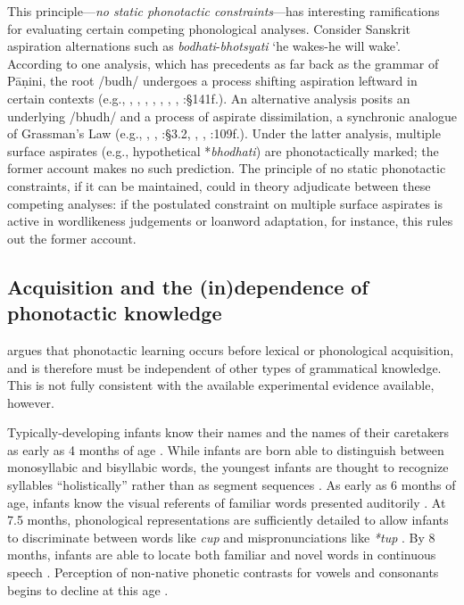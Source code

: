 This principle---\emph{no static phonotactic constraints}---has interesting ramifications for evaluating certain competing phonological analyses.
Consider Sanskrit aspiration alternations such as \emph{bodhati}-\emph{bhotsyati} `he wakes-he will wake'.
According to one analysis, which has precedents as far back as the grammar of Pāṇini, the root /budh/ undergoes a process shifting aspiration leftward in certain contexts (e.g., \citealt{Borowsky1983}, \citealt{Hoenigswald1965}, \citealt{Kaye1985}, \citealt{Sag1974}, \citeyear{Sag1976}, \citealt{Schindler1976}, \citealt{Stemberger1980}, \citealt{Whitney1889}:\S141f.).
An alternative analysis posits an underlying /bhudh/ and a process of aspirate dissimilation, a synchronic analogue of Grassman's Law (e.g., \citealt{Anderson1970}, \citealt{Hoard1975}, \citealt{Kiparsky1965}:\S3.2, \citealt{Phelps1973}, \citealt{Phelps1975b}, \citealt{Zwicky1965}:109f.).
Under the latter analysis, multiple surface aspirates (e.g., hypothetical *\emph{bhodhati}) are phonotactically marked; the former account makes no such prediction.
The principle of no static phonotactic constraints, if it can be maintained, could in theory adjudicate between these competing analyses: if the postulated constraint on multiple surface aspirates is active in wordlikeness judgements or loanword adaptation, for instance, this rules out the former account.

\subsection{Acquisition and the (in)dependence of phonotactic knowledge}
\label{ss:aerbpp}

\citet{Hayes2004b} argues that phonotactic learning occurs before lexical or phonological acquisition, and is therefore must be independent of other types of grammatical knowledge.
This is not fully consistent with the available experimental evidence available, however.

Typically-developing infants know their names and the names of their caretakers as early as 4 months of age \citep{Bortfeld2005,Mandel1995,Tincoff1999}.
While infants are born able to distinguish between monosyllabic and bisyllabic words, the youngest infants are thought to recognize syllables ``holistically'' rather than as segment sequences \citep{Bertoncini1981,Eimas1999,Jusczyk1987}.
As early as 6 months of age, infants know the visual referents of familiar words presented auditorily \citep{Bergelson2012}.
At 7.5 months, phonological representations are sufficiently detailed to allow infants to discriminate between words like \emph{cup} and mispronunciations like \emph{*tup} \citep{Jusczyk1995}.
By 8 months, infants are able to locate both familiar and novel words in continuous speech \citep{Jusczyk1997,Seidl2006}.
Perception of non-native phonetic contrasts for vowels and consonants begins to decline at this age \citep{Best1994,Polka1994,Werker1981,Werker1984,Werker1988}.

